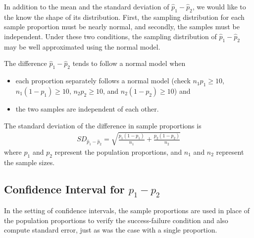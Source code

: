 In addition to the mean and the standard deviation of $\hat{p}_1 - \hat{p}_2$, we would like to the know the shape of its distribution. First, the sampling distribution for each sample proportion must be nearly normal, and secondly, the samples must be independent. Under these two conditions, the sampling distribution of $\hat{p}_1 - \hat{p}_2$ may be well approximated using the normal model.


\begin{termBox}{
The difference $\hat{p}_1 - \hat{p}_2$ tends to follow a normal model when
\begin{itemize}
\setlength{\itemsep}{0mm}
\item each proportion separately follows a normal model (check $n_1p_1 \geq 10$, $n_1(1-p_1) \geq 10$, $n_2p_2 \geq 10$, and $n_2(1-p_2) \geq 10$) and
\item the two samples are independent of each other.
\end{itemize}
The standard deviation of the difference in sample proportions is
\begin{eqnarray}
SD_{\hat{p}_1 - \hat{p}_2}
	= \sqrt{\frac{p_1(1-p_1)}{n_1} + \frac{p_2(1-p_2)}{n_2}}
\label{sdForDiffOfProp}
\end{eqnarray}
where $p_1$ and $p_2$ represent the population proportions, and $n_1$ and $n_2$ represent the sample sizes.}
\end{termBox}


\subsection{Confidence Interval for $p_1 -p_2$}

In the setting of confidence intervals, the sample proportions are used in place of the population proportions to verify the success-failure condition and also compute standard error, just as was the case with a single proportion.

